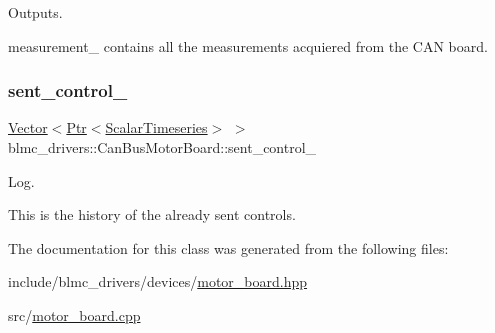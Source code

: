 Outputs. 

measurement\+\_\+ contains all the measurements acquiered from the C\+AN board. \mbox{\label{classblmc__drivers_1_1CanBusMotorBoard_ab5296d55684d48b538844c3b96df6594}} 
\subsubsection{\texorpdfstring{sent\+\_\+control\+\_\+}{sent\_control\_}}
{\footnotesize\ttfamily \hyperlink{classblmc__drivers_1_1MotorBoardInterface_abeb474bef6d85dffcd5227e5ea965cc5}{Vector}$<$\hyperlink{classblmc__drivers_1_1MotorBoardInterface_a6a733b7ed7a3a96f6b0712b6bb5307f8}{Ptr}$<$\hyperlink{classblmc__drivers_1_1MotorBoardInterface_a14e237254ba495a66091ea3a3a33fa75}{Scalar\+Timeseries}$>$ $>$ blmc\+\_\+drivers\+::\+Can\+Bus\+Motor\+Board\+::sent\+\_\+control\+\_\+\hspace{0.3cm}{\ttfamily [private]}}



Log. 

This is the history of the already sent controls. 

The documentation for this class was generated from the following files\+:\begin{DoxyCompactItemize}
\item 
include/blmc\+\_\+drivers/devices/\hyperlink{motor__board_8hpp}{motor\+\_\+board.\+hpp}\item 
src/\hyperlink{motor__board_8cpp}{motor\+\_\+board.\+cpp}\end{DoxyCompactItemize}

